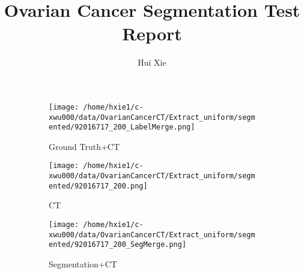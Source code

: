 \documentclass[12pt]{article}
\title{Ovarian Cancer Segmentation Test Report}
\author{Hui Xie}
\begin{document}
\maketitle

\begin{figure}
	\begin{subfigure}{\textwidth}
		\centering
		\texttt{[image: /home/hxie1/c-xwu000/data/OvarianCancerCT/Extract\_uniform/segmented/92016717\_200\_LabelMerge.png]}
		\caption{Ground Truth+CT}
	\end{subfigure}

	\begin{subfigure}{\textwidth}
		\centering
		\texttt{[image: /home/hxie1/c-xwu000/data/OvarianCancerCT/Extract\_uniform/segmented/92016717\_200.png]}
		\caption{CT}
	\end{subfigure}

	\begin{subfigure}{\textwidth}
		\centering
		\texttt{[image: /home/hxie1/c-xwu000/data/OvarianCancerCT/Extract\_uniform/segmented/92016717\_200\_SegMerge.png]}
		\caption{Segmentation+CT}
	\end{subfigure}

\caption{}
\end{figure}
\end{document}
